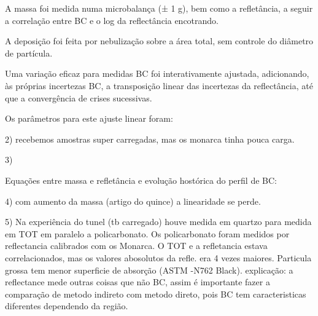 A massa foi medida numa microbalança (± 1 g), bem como a refletância, 
a seguir a correlação entre BC e o log da reflectância encotrando.

A deposição foi feita por nebulização sobre a área total, sem controle do diâmetro de partícula.


Uma variação eficaz para medidas BC foi interativamente ajustada, adicionando, às próprias incertezas BC, a transposição linear das incertezas da reflectância, até que a convergência de crises sucessivas.

Os parâmetros para este ajuste linear foram:





2) recebemos amostras super carregadas, mas os monarca tinha pouca carga.

3) 

Equações entre massa e refletância e evolução hostórica do perfil de BC:

4) com aumento da massa (artigo do quince) a linearidade se perde. 

5) Na experiência do tunel (tb carregado) houve medida em quartzo para medida
em TOT em paralelo a policarbonato. Os policarbonato foram medidos por reflectancia
calibrados com os Monarca. O TOT e a refletancia estava correlacionados, mas
os valores abosolutos da refle. era 4 vezes maiores.
Particula grossa tem menor superficie de absorção (ASTM -N762 Black). 
explicação: a reflectance mede outras coisas que não BC, assim é importante
fazer a comparação de metodo indireto com metodo direto, pois BC tem caracteristicas
diferentes dependendo da região.

